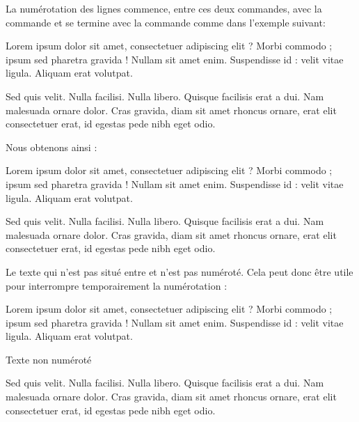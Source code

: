 La numérotation des lignes commence, entre ces deux commandes, avec la commande  et se termine avec la commande  comme dans l'exemple suivant:

\begin{latexcode}
\beginnumbering
\pstart %
Lorem ipsum dolor sit amet, consectetuer adipiscing elit ?
Morbi commodo ; ipsum sed pharetra gravida !
Nullam sit amet enim. Suspendisse id : velit vitae ligula.
Aliquam erat volutpat.

Sed quis velit. Nulla facilisi. Nulla libero. 
Quisque facilisis erat a dui. 
Nam malesuada ornare dolor.
Cras gravida, diam sit amet rhoncus ornare, 
erat  elit consectetuer erat, id egestas pede nibh eget odio.
\pend %
\endnumbering
\end{latexcode}

Nous obtenons ainsi : 

\begin{minipage}{0.8\textwidth}
\beginnumbering
\pstart %
Lorem ipsum dolor sit amet, consectetuer adipiscing elit ?
Morbi commodo ; ipsum sed pharetra gravida !
Nullam sit amet enim. Suspendisse id : velit vitae ligula. 
Aliquam erat volutpat.


Sed quis velit. Nulla facilisi. Nulla libero. 
 Quisque facilisis erat a dui. %
Nam malesuada ornare dolor.
Cras gravida, diam sit amet rhoncus ornare, 
erat  elit consectetuer erat, id egestas pede nibh eget odio.
\pend
\endnumbering
\end{minipage}



Le texte qui n'est pas situé entre  et  n'est pas numéroté. Cela peut donc être utile pour interrompre temporairement la numérotation :

\begin{latexcode}
\beginnumbering
\pstart %
Lorem ipsum dolor sit amet, consectetuer adipiscing elit ?
Morbi commodo ; ipsum sed pharetra gravida !
Nullam sit amet enim. Suspendisse id : velit vitae ligula.
Aliquam erat volutpat.
\pend

Texte non numéroté

\pstart Sed quis velit. Nulla facilisi. Nulla libero. 
Quisque facilisis erat a dui. 
Nam malesuada ornare dolor.
Cras gravida, diam sit amet rhoncus ornare, 
erat  elit consectetuer erat, id egestas pede nibh eget odio.
\pend %
\endnumbering
\end{latexcode}

